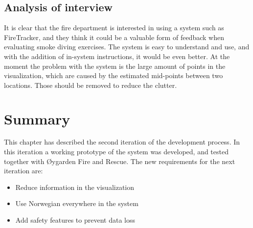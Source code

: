 \documentclass[../Main/thesis.tex]{subfiles}
\begin{document}
\subsection{Analysis of interview}
It is clear that the fire department is interested in using a system such as FireTracker, and they think it could be a valuable form of feedback when evaluating smoke diving exercises.
The system is easy to understand and use, and with the addition of in-system instructions, it would be even better.
At the moment the problem with the system is the large amount of points in the visualization, which are caused by the estimated mid-points between two locations.
Those should be removed to reduce the clutter.

\section{Summary}
This chapter has described the second iteration of the development process.
In this iteration a working prototype of the system was developed, and tested together with Øygarden Fire and Rescue.
The new requirements for the next iteration are:
\begin{itemize}
	\item Reduce information in the visualization
	\item Use Norwegian everywhere in the system
	\item Add safety features to prevent data loss
\end{itemize}
\end{document}

